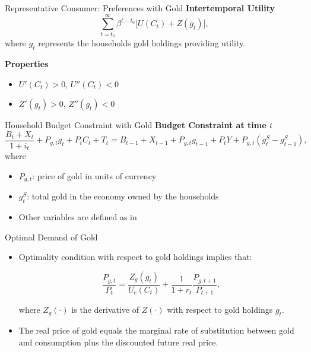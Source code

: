 \documentclass[11pt,aspectratio=169]{beamer}
\begin{document}
\begin{frame}{Representative Consumer: Preferences with Gold}
\textbf{Intertemporal Utility}
\begin{equation}
\sum_{t=t_0}^{\infty} \beta^{t-t_0} \big[ U(C_t) + Z(g_t) \big],
\label{eq: utility_gold}
\end{equation}
where $g_t$ represents the households gold holdings providing utility.

\vspace{0.3cm}
\textbf{Properties}
\begin{itemize}
  \item $U'(C_t) > 0$, $U''(C_t) < 0$ 
  \item $Z'(g_t) > 0$, $Z''(g_t) < 0$
\end{itemize}
\end{frame}

\begin{frame}{Household Budget Constraint with Gold}
\textbf{Budget Constraint at time $t$}
\begin{equation} \label{eq: budget_gold}
\frac{B_t + X_t}{1+i_t} + P_{g,t} g_t + P_t C_t + T_t
= B_{t-1} + X_{t-1} + P_{g,t} g_{t-1} + P_t Y + P_{g,t} (g_t^S - g_{t-1}^S),
\end{equation}
\vspace{0.2cm}
where
\begin{itemize}
  \item $P_{g,t}$: price of gold in units of currency
  \item $g_t^S$: total gold in the economy owned by the households
  \item Other variables are defined as in \hyperlink{orig_budget}{}
\end{itemize}
\end{frame}

\begin{frame}{Optimal Demand of Gold}
\begin{itemize}
  \item Optimality condition with respect to gold holdings implies that:

\begin{equation} \label{eq: FOC_gold}
\frac{P_{g,t}}{P_t} = \frac{Z_g(g_t)}{U_c(C_t)} + \frac{1}{1+r_t} \frac{P_{g,t+1}}{P_{t+1}},
\end{equation}

where $Z_g(\cdot)$ is the derivative of $Z(\cdot)$ with respect to gold holdings $g_t$.
\vspace{0.3cm}
  \item The real price of gold equals the marginal rate of substitution between gold and consumption plus the discounted future real price.
\end{itemize}
\end{frame}
\end{document}
